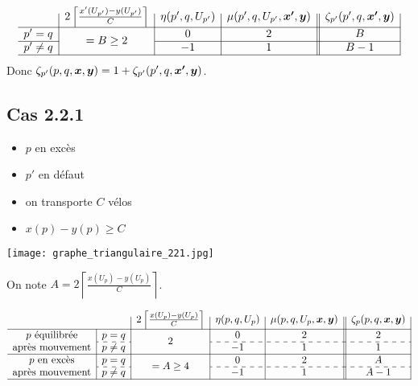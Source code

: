 \begin{gather*}
  \begin{array}{r|c|c|c||c|}
    & 2 \left\lceil \frac{x'(U_{p'})-y(U_{p'})}{C} \right\rceil
    & \eta(p',q,U_{p'})
    & \mu(p',q,U_{p'},\bs{x'},\bs{y})
    & \zeta_{p'}(p',q,\bs{x'},\bs{y})
    \\ \hline
    p' = q
    & \multirow{2}{*}{$= B \ge 2$}
    & 0
    & 2
    & B
    \\ \cline{1-1}\cline{3-5}
    p' \ne q
    &
    & -1
    & 1
    & B - 1
    \\ \hline
  \end{array}
\end{gather*}
Donc $\zeta_{p'}(p,q,\boldsymbol{x},\boldsymbol{y}) = 1 + \zeta_{p'}(p',q,\boldsymbol{x'},\boldsymbol{y})$.

\subsection*{Cas 2.2.1}

\begin{minipage}{0.5\linewidth}
\begin{itemize}
\item $p$ en excès
\item $p'$ en défaut
\item on transporte $C$ vélos
\item $x(p)-y(p) \ge C$
\end{itemize}
\end{minipage}
\begin{minipage}{0.5\linewidth}
\begin{center}
\texttt{[image: graphe\_triangulaire\_221.jpg]}
\end{center}
\end{minipage}

On note $A = 2 \left\lceil \frac{\displaystyle x(U_p)-y(U_p)}{\displaystyle C} \right\rceil$.

\begin{gather*}
  \begin{array}{c|c|c|c|c||c|}
    \multicolumn{2}{c|}{}
    & 2 \left\lceil \frac{x(U_p)-y(U_p)}{C} \right\rceil
    & \eta(p,q,U_p)
    & \mu(p,q,U_p,\bs{x},\bs{y})
    & \zeta_p(p,q,\bs{x},\bs{y})
    \\ \hline
    p \mbox{ équilibrée}
    & p=q
    & \multirow{2}{*}{$2$}
    & 0
    & 2
    & 2
    \\ \cdashline{2-2}\cdashline{4-6}
    \mbox{après mouvement}
    & p \ne q
    &
    & -1
    & 1
    & 1
    \\ \hline
    p \mbox{ en excès}
    & p=q
    & \multirow{2}{*}{$= A \ge 4$}
    & 0
    & 2
    & A
    \\ \cdashline{2-2}\cdashline{4-6}
    \mbox{après mouvement}
    & p \ne q
    &
    & -1
    & 1
    & A-1
    \\ \hline
  \end{array}
\end{gather*}


